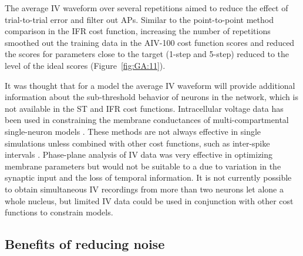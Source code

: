 \smallskip{}

The average IV waveform over several repetitions aimed to reduce the effect
of trial-to-trial error and filter out APs.  Similar to the point-to-point
method comparison in the IFR cost function, increasing the number of
repetitions smoothed out the training data in the AIV-100 cost function
scores and reduced the scores for parameters close to the target (1-step
and 5-step) reduced to the level of the ideal scores
(Figure~\ref{fig:GA:11}).

\smallskip{}

It was thought that for a {\BNN} model the average IV waveform will provide
additional information about the sub-threshold behavior of neurons in the
network, which is not available in the ST and IFR cost functions.
Intracellular voltage data has been used in constraining the membrane
conductances of multi-compartmental single-neuron models
\citep{Le_Masson:2000,KerenPeledEtAl:2005}.  These methods are not always
effective in single simulations unless combined with other cost functions,
such as inter-spike intervals \citep{KerenPeledEtAl:2005}. Phase-plane
analysis of IV data was very effective in optimizing membrane parameters
\citep{VanDeEtAl:2008,KerenPeledEtAl:2005} but would not be suitable to a
{\BNN} due to variation in the synaptic input and the loss of temporal
information.  It is not currently possible to obtain simultaneous IV
recordings from more than two neurons let alone a whole nucleus, but
limited IV data could be used in conjunction with other cost functions to
constrain {\BNN} models.

\subsection{Benefits of reducing noise}\label{sec:GA:benef-reduc-noise}



